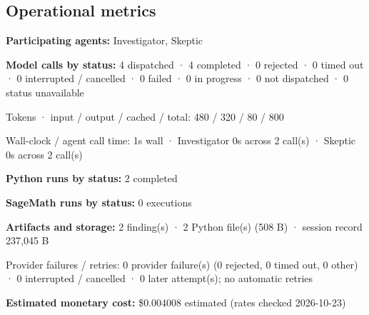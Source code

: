 \documentclass[11pt]{article}
\begin{document}
\subsection{Operational metrics}
\textbf{Participating agents:} Investigator, Skeptic\par
\textbf{Model calls by status:} 4 dispatched · 4 completed · 0 rejected · 0 timed out · 0 interrupted / cancelled · 0 failed · 0 in progress · 0 not dispatched · 0 status unavailable\par
Tokens · input / output / cached / total: 480 / 320 / 80 / 800\par
Wall-clock / agent call time: 1s wall · Investigator 0s across 2 call(s) · Skeptic 0s across 2 call(s)\par
\textbf{Python runs by status:} 2 completed\par
\textbf{SageMath runs by status:} 0 executions\par
\textbf{Artifacts and storage:} 2 finding(s) · 2 Python file(s) (508 B) · session record 237,045 B\par
Provider failures / retries: 0 provider failure(s) (0 rejected, 0 timed out, 0 other) · 0 interrupted / cancelled · 0 later attempt(s); no automatic retries\par
\textbf{Estimated monetary cost:} \$0.004008 estimated (rates checked 2026-10-23)\par
\end{document}
